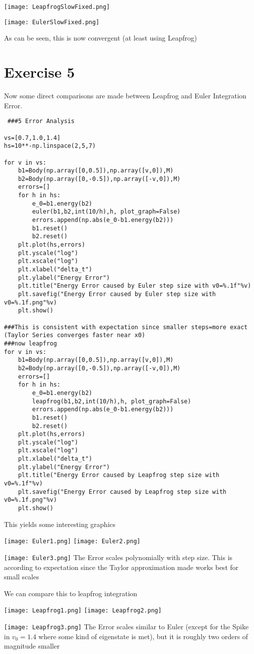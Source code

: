 \documentclass[12pt,a4paper,twoside]{article}
\begin{document}
\texttt{[image: LeapfrogSlowFixed.png]}

\texttt{[image: EulerSlowFixed.png]}

As can be seen, this is now convergent (at least using Leapfrog)
\newpage
\section*{Exercise 5}

Now some direct comparisons are made between Leapfrog and Euler Integration Error.

\begin{lstlisting}
 ###5 Error Analysis

vs=[0.7,1.0,1.4]
hs=10**-np.linspace(2,5,7)

for v in vs:     
    b1=Body(np.array([0,0.5]),np.array([v,0]),M)
    b2=Body(np.array([0,-0.5]),np.array([-v,0]),M)
    errors=[]
    for h in hs:
        e_0=b1.energy(b2)
        euler(b1,b2,int(10/h),h, plot_graph=False)
        errors.append(np.abs(e_0-b1.energy(b2)))
        b1.reset()
        b2.reset()
    plt.plot(hs,errors)
    plt.yscale("log")
    plt.xscale("log")
    plt.xlabel("delta_t")
    plt.ylabel("Energy Error")
    plt.title("Energy Error caused by Euler step size with v0=%.1f"%v)
    plt.savefig("Energy Error caused by Euler step size with v0=%.1f.png"%v)
    plt.show()

###This is consistent with expectation since smaller steps=more exact (Taylor Series converges faster near x0)
###now leapfrog
for v in vs:     
    b1=Body(np.array([0,0.5]),np.array([v,0]),M)
    b2=Body(np.array([0,-0.5]),np.array([-v,0]),M)
    errors=[]
    for h in hs:
        e_0=b1.energy(b2)
        leapfrog(b1,b2,int(10/h),h, plot_graph=False)
        errors.append(np.abs(e_0-b1.energy(b2)))
        b1.reset()
        b2.reset()
    plt.plot(hs,errors)
    plt.yscale("log")
    plt.xscale("log")
    plt.xlabel("delta_t")
    plt.ylabel("Energy Error")
    plt.title("Energy Error caused by Leapfrog step size with v0=%.1f"%v)
    plt.savefig("Energy Error caused by Leapfrog step size with v0=%.1f.png"%v)
    plt.show()
\end{lstlisting}

This yields some interesting graphics

\texttt{[image: Euler1.png]}
\texttt{[image: Euler2.png]}

\texttt{[image: Euler3.png]}
\linebreak
The Error scales polynomially with step size. This is according to expectation since the Taylor approximation made works best for small scales\linebreak
\newpage

We can compare this to leapfrog integration

\texttt{[image: Leapfrog1.png]}
\texttt{[image: Leapfrog2.png]}

\texttt{[image: Leapfrog3.png]}
\linebreak
The Error scales similar to Euler (except for the Spike in $v_0=1.4$ where some kind of eigenstate is met), but it is roughly two orders of magnitude smaller 
\end{document}
